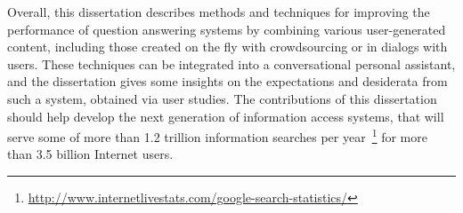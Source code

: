 Overall, this dissertation describes methods and techniques for improving the performance of question answering systems by combining various user-generated content, including those created on the fly with crowdsourcing or in dialogs with users.
These techniques can be integrated into a conversational personal assistant, and the dissertation gives some insights on the expectations and desiderata from such a system, obtained via user studies.
The contributions of this dissertation should help develop the next generation of information access systems, that will serve some of more than 1.2 trillion information searches per year~\footnote{\href{url}{http://www.internetlivestats.com/google-search-statistics/}} for more than 3.5 billion Internet users.


